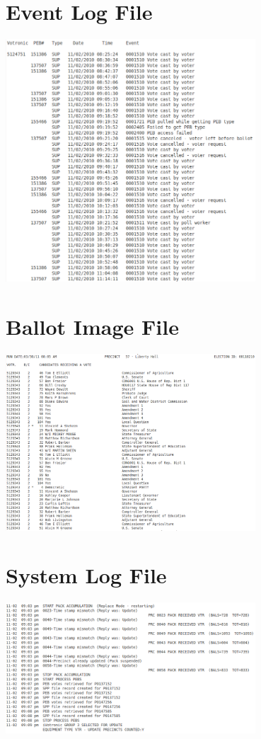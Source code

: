 \appendix
\section{Event Log File}\label{app:el} 
\includegraphics[width=0.7\textwidth]{eventLog}
\section{Ballot Image File}\label{app:bi}
\includegraphics[width=0.7\textwidth]{ballot}
\section{System Log File}\label{app:sl}
\includegraphics[width=0.7\textwidth]{system}
